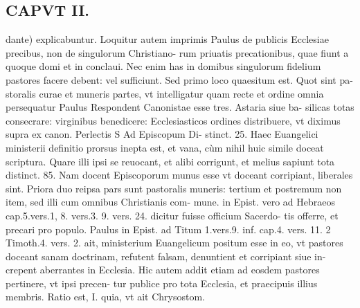 \documentclass{article}
\begin{document}
\begin{pages}
\section*{CAPVT II. }
\marginpar{[ p.39 ]}\pstart dante) explicabuntur.  \pend\pstart Loquitur autem imprimis Paulus de publicis Ecclesiae precibus, non de singulorum Christiano- rum priuatis precationibus, quae fiunt a quoque domi et in conclaui. Nec enim has in domibus singulorum fidelium pastores facere debent: vel sufficiunt.  \pend\pstart Sed primo loco quaesitum est. Quot sint pa- storalis curae et muneris partes, vt intelligatur quam recte et ordine omnia persequatur Paulus Respondent Canonistae esse tres. Astaria siue ba- silicas totas consecrare: virginibus benedicere: Ecclesiasticos ordines distribuere, vt diximus supra ex canon. Perlectis S Ad Episcopum Di- stinct. 25. Haec Euangelici ministerii definitio prorsus inepta est, et vana, cùm nihil huic simile doceat scriptura. Quare illi ipsi se reuocant, et alibi corrigunt, et melius sapiunt tota distinct. 85. Nam docent Episcoporum munus esse vt doceant corripiant, liberales sint. Priora duo reipsa pars sunt pastoralis muneris: tertium et postremum non item, sed illi cum omnibus Christianis com- mune. in Epist. vero ad Hebraeos cap.5.vers.1, 8. vers.3. 9. vers. 24. dicitur fuisse officium Sacerdo- tis offerre, et precari pro populo. Paulus in Epist. ad Titum 1.vers.9. inf. cap.4. vers. 11. 2 Timoth.4. vers. 2. ait, ministerium Euangelicum positum esse in eo, vt pastores doceant sanam doctrinam, refutent falsam, denuntient et corripiant siue in- crepent aberrantes in Ecclesia. Hic autem addit etiam ad eosdem pastores pertinere, vt ipsi precen- tur publice pro tota Ecclesia, et praecipuis illius membris. Ratio est, I. quia, vt ait Chrysostom.  \pend

\end{pages}
\end{document}
